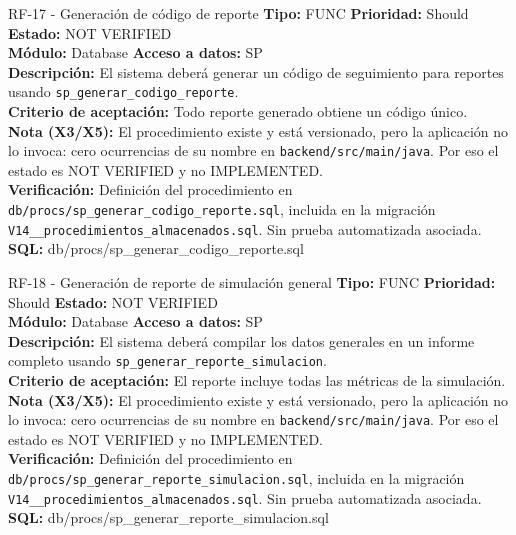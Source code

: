 \documentclass[11pt,a4paper]{article}
\begin{document}
\begin{requisito}{RF-17 - Generación de código de reporte}
    \textbf{Tipo:} FUNC \quad \textbf{Prioridad:} Should \quad \textbf{Estado:} NOT VERIFIED \\[0.2cm]
    \textbf{Módulo:} Database \quad \textbf{Acceso a datos:} SP \\[0.2cm]
    \textbf{Descripción:} El sistema deberá generar un código de seguimiento para reportes usando \texttt{sp\_generar\_codigo\_reporte}. \\[0.2cm]
    \textbf{Criterio de aceptación:} Todo reporte generado obtiene un código único. \\[0.2cm]
    \textbf{Nota (X3/X5):} El procedimiento existe y está versionado, pero la aplicación no lo invoca: cero ocurrencias de su nombre en \texttt{backend/src/main/java}. Por eso el estado es NOT VERIFIED y no IMPLEMENTED. \\[0.2cm]
    \textbf{Verificación:} Definición del procedimiento en \texttt{db/procs/sp\_generar\_codigo\_reporte.sql}, incluida en la migración \texttt{V14\_\_procedimientos\_almacenados.sql}. Sin prueba automatizada asociada. \quad \textbf{SQL:} db/procs/sp\_generar\_codigo\_reporte.sql
\end{requisito}

\begin{requisito}{RF-18 - Generación de reporte de simulación general}
    \textbf{Tipo:} FUNC \quad \textbf{Prioridad:} Should \quad \textbf{Estado:} NOT VERIFIED \\[0.2cm]
    \textbf{Módulo:} Database \quad \textbf{Acceso a datos:} SP \\[0.2cm]
    \textbf{Descripción:} El sistema deberá compilar los datos generales en un informe completo usando \texttt{sp\_generar\_reporte\_simulacion}. \\[0.2cm]
    \textbf{Criterio de aceptación:} El reporte incluye todas las métricas de la simulación. \\[0.2cm]
    \textbf{Nota (X3/X5):} El procedimiento existe y está versionado, pero la aplicación no lo invoca: cero ocurrencias de su nombre en \texttt{backend/src/main/java}. Por eso el estado es NOT VERIFIED y no IMPLEMENTED. \\[0.2cm]
    \textbf{Verificación:} Definición del procedimiento en \texttt{db/procs/sp\_generar\_reporte\_simulacion.sql}, incluida en la migración \texttt{V14\_\_procedimientos\_almacenados.sql}. Sin prueba automatizada asociada. \quad \textbf{SQL:} db/procs/sp\_generar\_reporte\_simulacion.sql
\end{requisito}
\end{document}
